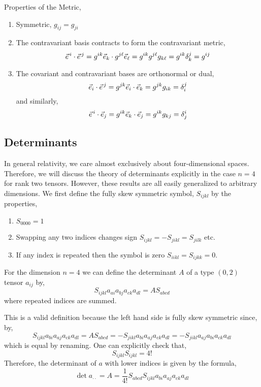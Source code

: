 \documentclass[11pt, a4paper]{article}
\begin{document}
\begin{theorem}
Properties of the Metric,
\begin{enumerate}
\item Symmetric, $g_{ij} = g_{ji}$

\item The contravariant basis contracts to form the contravariant metric, 
\[\vec{e}^{\, i} \cdot \vec{e}^{\, j} = g^{ik} \vec{e}_k \cdot g^{j \ell} \vec{e}_{\ell} = g^{ik} g^{j \ell} g_{k \ell} = g^{ik} \delta^j_k  = g^{ij}\]

\item The covariant and contravariant bases are orthonormal or dual,
\[ \vec{e}_i \cdot \vec{e}^{\, j} = g^{jk} \vec{e}_i \cdot \vec{e}_k = g^{jk} g_{ik} = \delta^j_i \]
and similarly,
\[ \vec{e}^{\, i} \cdot \vec{e}_j = g^{ik} \vec{e}_k \cdot \vec{e}_j = g^{ik} g_{kj} = \delta^i_j \]
\end{enumerate}
\end{theorem}

\subsection{Determinants}

In general relativity, we care almost exclusively about four-dimensional spaces. Therefore, we will discuss the theory of determinants explicitly in the case $n = 4$ for rank two tensors. However, these results are all easily generalized to arbitrary dimensions.
We first define the fully skew symmetric symbol, $S_{ijkl}$ by the properties,
\begin{enumerate}
\item $S_{0000} = 1$
\item Swapping any two indices changes sign $S_{ijkl} = - S_{jikl} = S_{jilk}$ etc.
\item If any index is repeated then the symbol is zero $S_{iikl} = S_{ijkk} = 0$.
\end{enumerate}

\begin{definition}
For the dimension $n = 4$ we can define the determinant $A$ of a type $(0, 2)$ tensor $a_{ij}$ by,
\[ S_{ijkl} a_{ai} a_{bj} a_{ck} a_{dl} = A S_{abcd}\]
where repeated indices are summed. 
\end{definition}
This is a valid definition because the left hand side is fully skew symmetric since,
by,
\[ S_{ijkl} a_{bi} a_{aj} a_{ck} a_{dl} = A S_{abcd} = - S_{jikl} a_{bi} a_{aj} a_{ck} a_{dl} = -  S_{jikl} a_{aj} a_{bi}  a_{ck} a_{dl} \]
which is equal by renaming. One can explicitly check that,
\[ S_{ijkl} S_{ijkl} = 4! \]
Therefore, the determinant of $a$ with lower indices is given by the formula,
\[ \det{a_{\cdot \cdot}} = A = \frac{1}{4!} S_{abcd} S_{ijkl} a_{bi} a_{aj} a_{ck} a_{dl}\]
\end{document}
